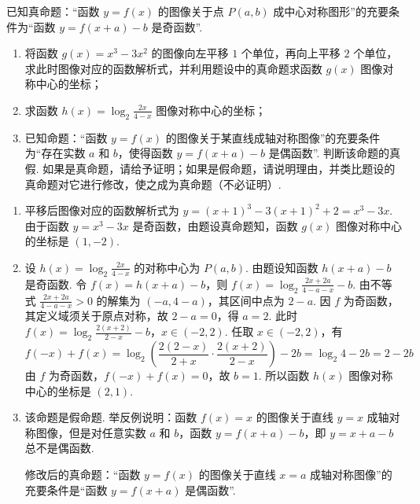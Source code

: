 \begin{problem}
已知真命题：“函数 \( y = f(x) \) 的图像关于点 \( P(a, b) \) 成中心对称图形”的充要条件为“函数 \( y = f(x + a) - b \) 是奇函数”.

\begin{enumerate}
\item 将函数 \( g(x)=x^{3}-3x^{2} \) 的图像向左平移 \(1\) 个单位，再向上平移 \(2\) 个单位，求此时图像对应的函数解析式，并利用题设中的真命题求函数 \( g(x) \) 图像对称中心的坐标；
\item 求函数 \( h(x)=\log_{2}\frac{2x}{4-x} \) 图像对称中心的坐标；
\item 已知命题：“函数 \( y = f(x) \) 的图像关于某直线成轴对称图像”的充要条件为“存在实数 \(a\) 和 \(b\)，使得函数 \( y = f(x + a) - b \) 是偶函数”. 判断该命题的真假. 如果是真命题，请给予证明；如果是假命题，请说明理由，并类比题设的真命题对它进行修改，使之成为真命题（不必证明）.
\end{enumerate}
\end{problem}

\begin{solution}
\begin{enumerate}
\item 平移后图像对应的函数解析式为 \(y=(x+1)^3-3(x+1)^2+2=x^3-3x\).
由于函数 \(y=x^3-3x\) 是奇函数，由题设真命题知，函数 \(g(x)\) 图像对称中心的坐标是 \((1,-2)\).

\item 设 \(h(x)=\log_2\frac{2x}{4-x}\) 的对称中心为 \(P(a,b)\). 由题设知函数 \(h(x+a)-b\) 是奇函数. 令 \(f(x)=h(x+a)-b\)，则 \(f(x)=\log_2\frac{2x+2a}{4-a-x}-b\).
由不等式 \(\frac{2x+2a}{4-a-x}>0\) 的解集为 \((-a,4-a)\)，其区间中点为 \(2-a\). 因 \(f\) 为奇函数，其定义域须关于原点对称，故 \(2-a=0\)，得 \(a=2\). 此时 \(f(x)=\log_2\frac{2(x+2)}{2-x}-b\)，\(x\in(-2,2)\).
任取 \(x\in(-2,2)\)，有
\[
f(-x)+f(x)
=\log_2\left(\frac{2(2-x)}{2+x}\cdot\frac{2(x+2)}{2-x}\right)-2b
=\log_2 4-2b
=2-2b
\]
由 \(f\) 为奇函数，\(f(-x)+f(x)=0\)，故 \(b=1\). 所以函数 \(h(x)\) 图像对称中心的坐标是 \((2,1)\).

\item 该命题是假命题. 举反例说明：函数 \(f(x)=x\) 的图像关于直线 \(y=x\) 成轴对称图像，但是对任意实数 \(a\) 和 \(b\)，函数 \(y=f(x+a)-b\)，即 \(y=x+a-b\) 总不是偶函数.

修改后的真命题：“函数 \(y=f(x)\) 的图像关于直线 \(x=a\) 成轴对称图像”的充要条件是“函数 \(y=f(x+a)\) 是偶函数”.
\end{enumerate}
\end{solution}
